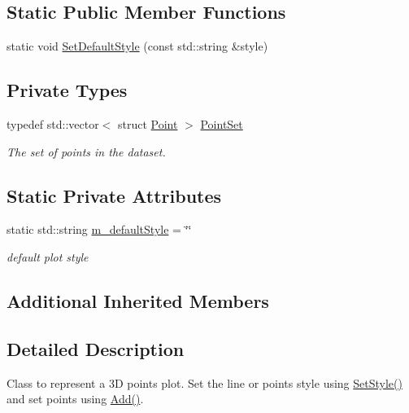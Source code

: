 \subsection*{Static Public Member Functions}
\begin{DoxyCompactItemize}
\item 
static void \hyperlink{classns3_1_1Gnuplot3dDataset_ae45abab300fba16add20834d6f212e10}{Set\+Default\+Style} (const std\+::string \&style)
\end{DoxyCompactItemize}
\subsection*{Private Types}
\begin{DoxyCompactItemize}
\item 
typedef std\+::vector$<$ struct \hyperlink{structns3_1_1Gnuplot3dDataset_1_1Point}{Point} $>$ \hyperlink{classns3_1_1Gnuplot3dDataset_ac35fc4eb85c072b31175e039e2bbd2b8}{Point\+Set}
\begin{DoxyCompactList}\small\item\em The set of points in the dataset. \end{DoxyCompactList}\end{DoxyCompactItemize}
\subsection*{Static Private Attributes}
\begin{DoxyCompactItemize}
\item 
static std\+::string \hyperlink{classns3_1_1Gnuplot3dDataset_a789ab2c87f3da8fe6367f0a770a0150d}{m\+\_\+default\+Style} = \char`\"{}\char`\"{}
\begin{DoxyCompactList}\small\item\em default plot style \end{DoxyCompactList}\end{DoxyCompactItemize}
\subsection*{Additional Inherited Members}


\subsection{Detailed Description}
Class to represent a 3D points plot. Set the line or points style using \hyperlink{classns3_1_1Gnuplot3dDataset_ae99331e66e6d5a39fdf407875be56f1f}{Set\+Style()} and set points using \hyperlink{classns3_1_1Gnuplot3dDataset_ad3a4b4baa637cfc099a488f3fcbf1975}{Add()}. 

